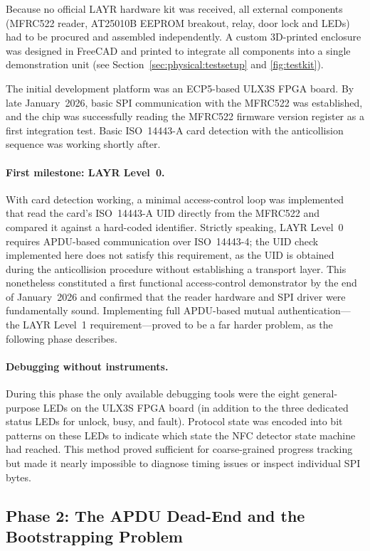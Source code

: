 \documentclass[manuscript,screen,nonacm]{acmart}
\begin{document}
Because no official LAYR hardware kit was received, all external
components (MFRC522 reader, AT25010B EEPROM breakout, relay,
door lock and LEDs) had to be
procured and assembled independently.
A custom 3D-printed enclosure was designed in FreeCAD
and printed to integrate all components into a single demonstration
unit (see Section~\ref{sec:physical:testsetup} and \cref{fig:testkit}).

The initial development platform was an ECP5-based ULX3S FPGA board.
By late January~2026, basic SPI communication with the MFRC522
was established, and the chip was successfully reading the MFRC522
firmware version register as a first integration test.
Basic ISO~14443-A card detection with the anticollision sequence
was working shortly after.

\paragraph{First milestone: LAYR Level~0.}
With card detection working, a minimal access-control loop was
implemented that read the card's ISO~14443-A UID directly from
the MFRC522 and compared it against a hard-coded identifier.
Strictly speaking, LAYR Level~0 requires APDU-based communication
over ISO~14443-4; the UID check implemented here does not satisfy
this requirement, as the UID is obtained during the anticollision
procedure without establishing a transport layer.
This nonetheless constituted a first functional access-control
demonstrator by the end of January~2026 and confirmed that the
reader hardware and SPI driver were fundamentally sound.
Implementing full APDU-based mutual authentication—the LAYR
Level~1 requirement—proved to be a far harder problem, as the
following phase describes.

\paragraph{Debugging without instruments.}
During this phase the only available debugging tools were the
eight general-purpose LEDs on the ULX3S FPGA board (in addition
to the three dedicated status LEDs for unlock, busy, and fault).
Protocol state was encoded into bit patterns on these LEDs to indicate
which state the NFC detector state machine had reached.
This method proved sufficient for coarse-grained progress tracking
but made it nearly impossible to diagnose timing issues or inspect
individual SPI bytes.

\subsection{Phase 2: The APDU Dead-End and the Bootstrapping Problem}
\label{sec:process:phase2}
\end{document}
